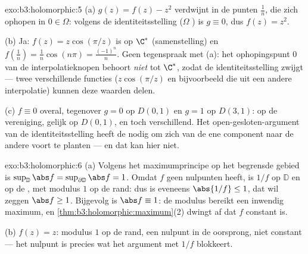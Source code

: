 \begin{solution}{exo:b3:holomorphic:5}
(a) $g(z) = f(z) - z^2$ verdwijnt in de punten $\frac1n$, die
zich ophopen in $0 \in \Omega$: volgens de identiteitsstelling
($\Omega$ ) is $g \equiv 0$, dus $f(z) = z^2$.

(b) Ja: $f(z) = z\cos(\pi/z)$ is  op $\C^*$
(samenstelling) en $f(\frac1n) = \frac1n\cos(n\pi) =
\frac{(-1)^n}n$. Geen tegenspraak met (a): het ophopingspunt $0$
van de interpolatieknopen behoort \emph{niet} tot $\C^*$, zodat
de identiteitsstelling zwijgt --- twee verschillende functies
($z\cos(\pi/z)$ en bijvoorbeeld die uit een andere interpolatie)
kunnen deze waarden delen.

(c) $f \equiv 0$ overal, tegenover $g = 0$ op $D(0,1)$ en $g = 1$
op $D(3,1)$:  op de  vereniging, gelijk
op $D(0,1)$, en toch verschillend. Het open-gesloten-argument van
de identiteitsstelling heeft de  nodig om zich van de
ene component naar de andere voort te planten --- en dat kan
hier niet.
\end{solution}

\begin{solution}{exo:b3:holomorphic:6}
(a) Volgens het maximumprincipe op het begrensde gebied is
$\sup_{\mathbb D}\abs f = \sup_{\partial\mathbb D}\abs f = 1$.
Omdat $f$ geen nulpunten heeft, is $1/f$  op $\mathbb D$
en  op de , met modulus $1$ op de rand: dus is
eveneens $\abs{1/f} \leq 1$, dat wil zeggen $\abs f \geq 1$.
Bijgevolg is $\abs f \equiv 1$: de modulus bereikt een inwendig
maximum, en \cref{thm:b3:holomorphic:maximum}(2) dwingt af dat
$f$ constant is.

(b) $f(z) = z$: modulus $1$ op de rand, een nulpunt in de
oorsprong, niet constant --- het nulpunt is precies wat het
argument met $1/f$ blokkeert.
\end{solution}

